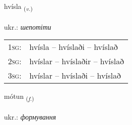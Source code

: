 \documentclass[frontgrid, backgrid]{flacards}\usepackage[]{graphicx}\usepackage[]{xcolor}
\begin{document}
\renewcommand{\blhead}{\vskip5pt {\small\bfseries\footnotesize Sagnorð | дієслово }}
\renewcommand{\bcfoot}{\vskip5pt \hspace{2pt}{\small\bfseries\footnotesize 3K}}


{hvísla \small{\textsubscript{(\textit{v.})}} \\[1ex] %
\textphonetic{[kʰvistla]} \\
ukr.: \emph{шепотіти} \\  [2ex]
\renewcommand*{\arraystretch}{0.8}
\begin{tabular}{p{1cm}l}
\textsc{1sg}: & hvísla -- hvíslaði -- hvíslað \\ 
\textsc{2sg}: & hvíslar -- hvíslaðir -- hvíslað \\ 
\textsc{3sg}: & hvíslar -- hvíslaði -- hvíslað \\ 
\end{tabular}
}

\renewcommand{\flhead}{\vskip5pt \fboxsep=0pt {\small\bfseries\footnotesize Nafnorð | іменник}}
\renewcommand{\fcfoot}{\vskip5pt \fboxsep=0pt \hspace{2pt}{\small\bfseries\footnotesize 3K}}

\renewcommand{\blhead}{\vskip5pt {\small\bfseries\footnotesize Nafnorð | іменник }}
\renewcommand{\bcfoot}{\vskip5pt \hspace{2pt}{\small\bfseries\footnotesize 3K}}


{mótun \small{\textsubscript{(\textit{f.})}} \\[1ex] %
\textphonetic{[mouːtʏn]} \\
ukr.: \emph{формування} \\  [2ex]
\renewcommand*{\arraystretch}{0.8}
}

\renewcommand{\flhead}{\vskip5pt \fboxsep=0pt {\small\bfseries\footnotesize Nafnorð | іменник}}
\renewcommand{\fcfoot}{\vskip5pt \fboxsep=0pt \hspace{2pt}{\small\bfseries\footnotesize 3K}}
\end{document}
